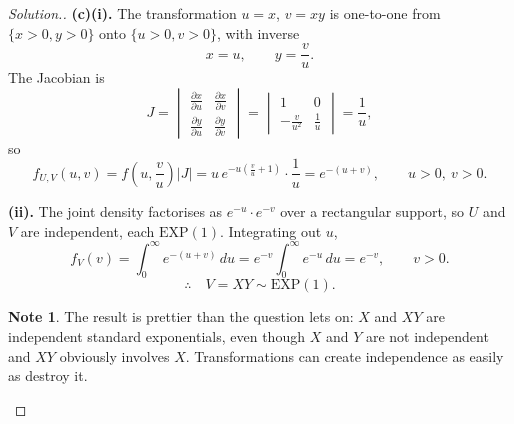 \documentclass[12pt,a4paper]{report}
\theoremstyle{definition}
\newtheorem{note}[thm]{Note}
\theoremstyle{plain}
\newenvironment{solution}
  {\renewcommand{\qedsymbol}{}\begin{proof}[\textit{Solution}.]}
  {\end{proof}}
\begin{document}
\begin{solution}
\textbf{(c)(i).} The transformation $u=x$, $v=xy$ is one-to-one from
$\{x>0,y>0\}$ onto $\{u>0,v>0\}$, with inverse
\[x=u,\qquad y=\frac{v}{u}.\]
The Jacobian is
\[J=\begin{vmatrix}
\frac{\partial x}{\partial u} & \frac{\partial x}{\partial v}\\[4pt]
\frac{\partial y}{\partial u} & \frac{\partial y}{\partial v}
\end{vmatrix}
=\begin{vmatrix}
1 & 0\\[4pt]
-\frac{v}{u^2} & \frac{1}{u}
\end{vmatrix}
=\frac{1}{u},\]
so
\[f_{U,V}(u,v)=f\left(u,\frac{v}{u}\right)\left|J\right|
=u\,e^{-u\left(\frac{v}{u}+1\right)}\cdot\frac{1}{u}
=e^{-(u+v)},\qquad u>0,\ v>0.\]

\textbf{(ii).} The joint density factorises as $e^{-u}\cdot e^{-v}$ over a
rectangular support, so $U$ and $V$ are independent, each $\text{EXP}(1)$.
Integrating out $u$,
\[f_V(v)=\int_0^\infty e^{-(u+v)}\,du=e^{-v}\int_0^\infty e^{-u}\,du=e^{-v},
\qquad v>0.\]
\[\therefore\quad V=XY\sim\text{EXP}(1).\]

\begin{note}
The result is prettier than the question lets on: $X$ and $XY$ are independent
standard exponentials, even though $X$ and $Y$ are not independent and $XY$
obviously involves $X$. Transformations can create independence as easily as
destroy it.
\end{note}
\end{solution}
\end{document}
